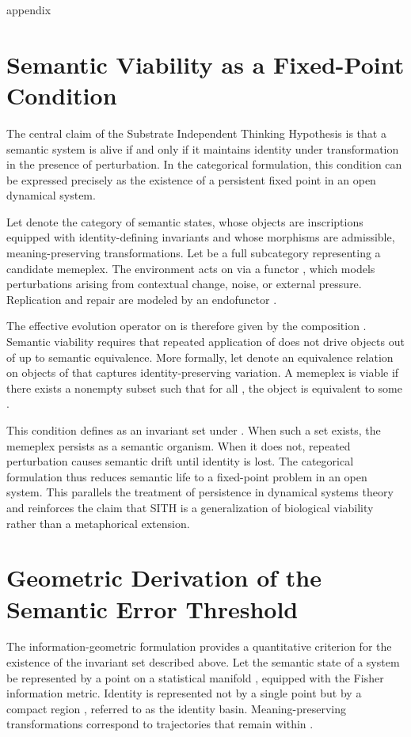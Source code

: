 \documentclass[11pt,oneside]{article}
\begin{document}
\newpage
appendix

\section{Semantic Viability as a Fixed-Point Condition}

The central claim of the Substrate Independent Thinking Hypothesis is that a semantic system is alive if and only if it maintains identity under transformation in the presence of perturbation. In the categorical formulation, this condition can be expressed precisely as the existence of a persistent fixed point in an open dynamical system.

Let  denote the category of semantic states, whose objects are inscriptions equipped with identity-defining invariants and whose morphisms are admissible, meaning-preserving transformations. Let  be a full subcategory representing a candidate memeplex. The environment acts on  via a functor , which models perturbations arising from contextual change, noise, or external pressure. Replication and repair are modeled by an endofunctor .

The effective evolution operator on  is therefore given by the composition . Semantic viability requires that repeated application of  does not drive objects out of  up to semantic equivalence. More formally, let  denote an equivalence relation on objects of  that captures identity-preserving variation. A memeplex is viable if there exists a nonempty subset  such that for all , the object  is equivalent to some .

This condition defines  as an invariant set under . When such a set exists, the memeplex persists as a semantic organism. When it does not, repeated perturbation causes semantic drift until identity is lost. The categorical formulation thus reduces semantic life to a fixed-point problem in an open system. This parallels the treatment of persistence in dynamical systems theory and reinforces the claim that SITH is a generalization of biological viability rather than a metaphorical extension.

\section{Geometric Derivation of the Semantic Error Threshold}

The information-geometric formulation provides a quantitative criterion for the existence of the invariant set described above. Let the semantic state of a system be represented by a point  on a statistical manifold , equipped with the Fisher information metric. Identity is represented not by a single point but by a compact region , referred to as the identity basin. Meaning-preserving transformations correspond to trajectories that remain within .
\end{document}
